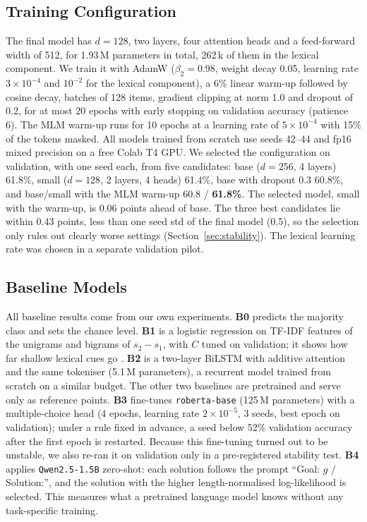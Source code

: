 \documentclass[11pt]{article}
\begin{document}
\subsection{Training Configuration}
The final model has $d{=}128$, two layers, four attention heads and a feed-forward width of 512, for 1.93\,M parameters in total, 262\,k of them in the lexical component. We train it with AdamW \cite{loshchilov2019decoupled} ($\beta_2{=}0.98$, weight decay 0.05, learning rate $3{\times}10^{-4}$ and $10^{-2}$ for the lexical component), a 6\% linear warm-up followed by cosine decay, batches of 128 items, gradient clipping at norm 1.0 and dropout of 0.2, for at most 20 epochs with early stopping on validation accuracy (patience 6). The MLM warm-up runs for 10 epochs at a learning rate of $5{\times}10^{-4}$ with 15\% of the tokens masked. All models trained from scratch use seeds 42--44 and fp16 mixed precision on a free Colab T4 GPU. We selected the configuration on validation, with one seed each, from five candidates: base ($d{=}256$, 4 layers) 61.8\%, small ($d{=}128$, 2 layers, 4 heads) 61.4\%, base with dropout 0.3 60.8\%, and base/small with the MLM warm-up 60.8 / \textbf{61.8\%}. The selected model, small with the warm-up, is 0.06 points ahead of base. The three best candidates lie within 0.43 points, less than one seed std of the final model (0.5), so the selection only rules out clearly worse settings (Section~\ref{sec:stability}). The lexical learning rate was chosen in a separate validation pilot.

\subsection{Baseline Models}
All baseline results come from our own experiments. \textbf{B0} predicts the majority class and sets the chance level. \textbf{B1} is a logistic regression on TF-IDF features of the unigrams and bigrams of $s_2 - s_1$, with $C$ tuned on validation; it shows how far shallow lexical cues go \cite{gururangan2018annotation}. \textbf{B2} is a two-layer BiLSTM with additive attention and the same tokeniser (5.1\,M parameters), a recurrent model trained from scratch on a similar budget. The other two baselines are pretrained and serve only as reference points. \textbf{B3} fine-tunes \texttt{roberta-base} \cite{liu2019roberta} (125\,M parameters) with a multiple-choice head (4 epochs, learning rate $2{\times}10^{-5}$, 3 seeds, best epoch on validation); under a rule fixed in advance, a seed below 52\% validation accuracy after the first epoch is restarted. Because this fine-tuning turned out to be unstable, we also re-ran it on validation only in a pre-registered stability test. \textbf{B4} applies \texttt{Qwen2.5-1.5B} \cite{qwen2025qwen25} zero-shot: each solution follows the prompt ``Goal: $g$ / Solution:'', and the solution with the higher length-normalised log-likelihood is selected. This measures what a pretrained language model knows without any task-specific training.
\end{document}

